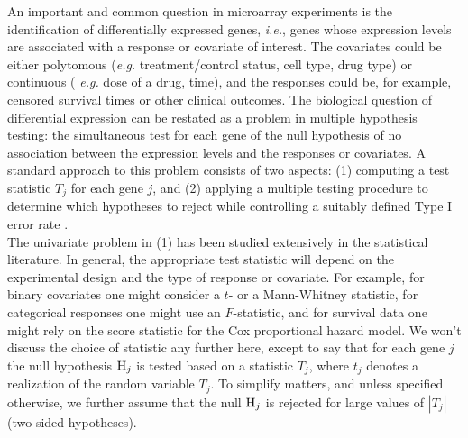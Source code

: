 \documentclass[11pt]{article}
\begin{document}
An important and common question in microarray experiments is the
identification of differentially expressed genes, {\it i.e.}, genes
whose expression levels are associated with a response or covariate of
interest. The covariates could be either polytomous ({\it e.g.}
treatment/control status, cell type, drug type) or continuous ({\it
  e.g.} dose of a drug, time), and the responses could be, for
example, censored survival times or other clinical outcomes. The
biological question of differential expression can be restated as a
problem in multiple hypothesis testing: the simultaneous test for each
gene of the null hypothesis of no association between the expression
levels and the responses or covariates. 
A standard approach to this problem consists of two aspects: (1) computing a test statistic $T_j$ for each gene $j$, and (2) applying a multiple testing procedure to determine which hypotheses to reject while controlling a suitably defined Type I error rate \citep{DudoitetalSinica02,Efronetal01,Golubetal,Manduchietal00,Tusheretal,Westfalletal01}.\\

The univariate problem in (1) has been studied extensively in the
statistical literature. In general, the appropriate test statistic
will depend on the experimental design and the type of response or
covariate. For example, for binary covariates one might consider a
$t$- or a Mann-Whitney statistic, for categorical responses one might
use an $F$-statistic, and for survival data one might rely on the
score statistic for the Cox proportional hazard model. We won't
discuss the choice of statistic any further here, except to say that
for each gene $j$ the null hypothesis ${\rm H}_j$ is tested based on a
statistic $T_j$, where $t_j$ denotes a realization of the random
variable $T_j$. To simplify matters, and unless specified otherwise, we further assume 
that the null ${\rm H}_j$ is rejected for large values of $|T_j|$
(two-sided hypotheses).  \\
\end{document}
